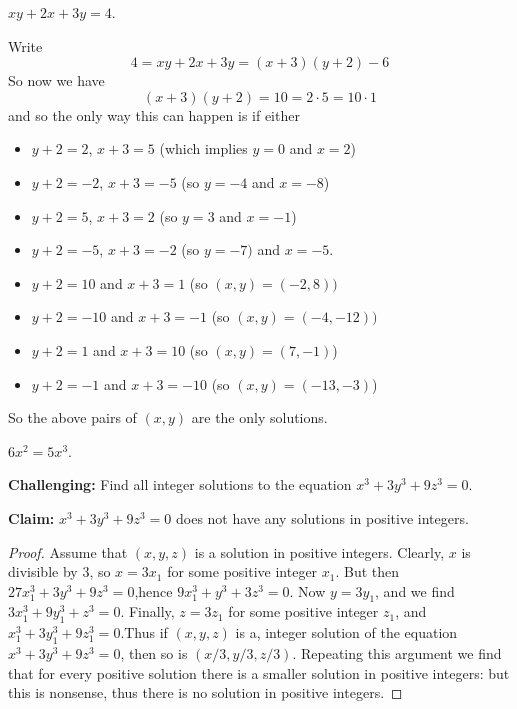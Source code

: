 \documentclass[11pt,dvipsnames]{book}
\numberwithin{equation}{section} %
\numberwithin{figure}{section} %
\numberwithin{table}{section} %
\begin{document}
\begin{exercise}
$xy+2x+3y=4$.


  
  

\begin{solution}
Write
\[
4=xy+2x+3y =(x+3)(y+2)-6
\]
So now we have 
\[
(x+3)(y+2)=10=2\cdot 5=10\cdot 1\]
and so the only way this can happen is if either 
\begin{itemize}
\item $y+2=2$, $x+3=5$ (which implies $y=0$ and $x=2$)
\item $y+2=-2$, $x+3=-5$ (so $y=-4$ and $x=-8$)
\item $y+2=5$, $x+3=2$ (so $y=3$ and $x=-1$)
\item $y+2=-5$, $x+3=-2$ (so $y=-7)$ and $x=-5$.
\item $y+2=10$ and $x+3=1$ (so $(x,y)=(-2,8))$
\item $y+2=-10$ and $x+3=-1$ (so $(x,y)=(-4,-12))$
\item $y+2=1$ and $x+3=10$ (so $(x,y)=(7,-1)$)
\item $y+2=-1$ and $x+3=-10$ (so $(x,y)=(-13,-3)$)
\end{itemize}
So the above pairs of $(x,y)$ are the only solutions.
\end{solution}

\end{exercise}

\begin{exercise}
 $6x^2=5x^3$.




\end{exercise}




\begin{exercise} {\bf Challenging:} Find all integer solutions to the equation $x^3+3y^3+9z^3= 0$.

\begin{solution}
{\bf Claim:} $x^3+3y^3+9z^3= 0$ does not have any solutions in positive integers.

\begin{proof}
Assume that $(x, y, z)$ is a solution in positive integers. Clearly, $x$ is divisible by $3$, so $x= 3x_1$ for some positive integer $x_1$. But then $27x_{1}^{3}+3y^3+9z^3= 0$,hence $9x_1^3+y^3+3z^3= 0$. Now $y= 3y_1$, and we find $3x_1^3+9y^{3}_{1}+z^3= 0$. Finally, $z= 3z_1$ for some positive integer $z_1$, and $x_{1}^{3}+ 3y_{1}^{3}+ 9z_{1}^{3}= 0$.Thus if $(x, y, z)$ is a, integer solution of the equation $x^3+3y^3+9z^3= 0$, then so is $(x/3,y/3,z/3)$. Repeating this argument we find that for every positive solution there is a smaller solution in positive integers: but this is nonsense, thus there is no solution in positive integers.
\end{proof}
\end{solution}


\end{exercise}
\end{document}
